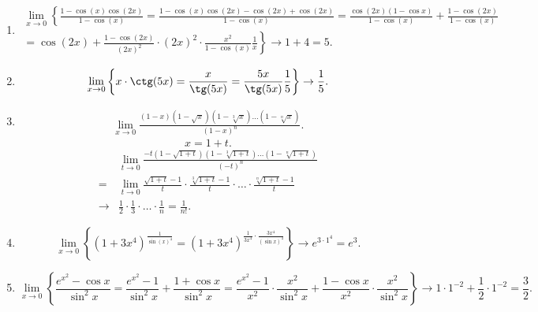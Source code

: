 \begin{enumerate}
\item 
    \begin{align*}
        \lim_{x \to 0} \left\{ \frac{1 - \cos(x)\cos(2x)}{1 - \cos(x)} 
        = \frac{1 - \cos(x)\cos(2x) - \cos(2x) + \cos(2x)}{1 - \cos(x)} 
        = \frac{\cos(2x) (1 - \cos x)}{1 - \cos(x)} + \frac{1 - \cos(2x)}{1 - \cos(x)} 
        \right.
        \\
        \left. = \cos(2x) + \frac{1 - \cos(2x)}{(2x)^2} \cdot (2x)^2 \cdot \frac{x^2}{1 - \cos(x)}\frac{1}{x}
        \right\}
        \to 1 + 4 = 5
    .\end{align*}

\item
    \begin{equation*}
        \lim_{x \to 0} \left\{ x \cdot \ctg(5x) = \frac{x}{\tg(5x)} = \frac{5x}{\tg(5x)}\frac{1}{5} \right\} \to \frac{1}{5}
    .\end{equation*}

\item
    \begin{align*}
        \lim_{x \to 0} 
        \frac{(1 - x)(1 - \sqrt{x})(1 - \sqrt[3]{x}) \dots (1 - \sqrt[n]{x})}{(1 - x)^{n}}
    .\end{align*}
    \begin{equation*}
        x = 1 + t
    .\end{equation*}
    \begin{align*}
        &\lim_{t \to 0} \frac{-t(1 - \sqrt{1 + t})(1 - \sqrt[3]{1 + t}) \dots (1 - \sqrt[n]{1 + t})}{(-t)^{n}} \\
        = &\lim_{t \to 0} \frac{\sqrt{1 + t} - 1}{t} \cdot \frac{\sqrt[3]{1 + t} - 1}{t} \cdot \dots \cdot \frac{\sqrt[n]{1 + t} - 1}{t} \\
        \to &\frac{1}{2} \cdot \frac{1}{3} \cdot \dots \cdot \frac{1}{n} = \frac{1}{n!}
    .\end{align*}

\item
    \begin{equation*}
        \lim_{x \to 0} \left\{
        \left(1 + 3x^{4}\right)^{\frac{1}{\sin(x)^4}}
        = \left(1 + 3x^{4}\right)^{\frac{1}{3x^4} \cdot \frac{3x^4}{(\sin x)^4}}
        \right\}
        \to e^{3 \cdot 1^4} = e^3
    .\end{equation*}

\item
    \begin{equation*}
        \lim_{x \to 0} \left\{
            \frac{e^{x^2} - \cos x}{\sin^2 x}
            = \frac{e^{x^2} - 1}{\sin^2 x} + \frac{1 + \cos x}{\sin^2 x}
            = \frac{e^{x^2} - 1}{x^2} \cdot \frac{x^2}{\sin^2 x} + \frac{1 - \cos x}{x^2} \cdot \frac{x^2}{\sin^2 x}
        \right\}
        \to 1 \cdot 1^{-2} + \frac{1}{2} \cdot 1^{-2} = \frac{3}{2}
    .\end{equation*}


\end{enumerate}
